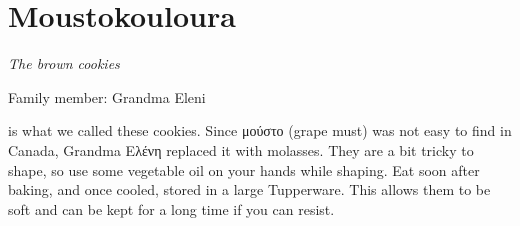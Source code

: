 \chapter{Moustokouloura}
\label{ch:moustokouloura}



\textit{The brown cookies}

Family member: Grandma Eleni

 is what we called these cookies. Since \textgreek{μούστο} (grape must) was not easy to find in Canada, Grandma \textgreek{Ελένη} replaced it with molasses. They are a bit tricky to shape, so use some vegetable oil on your hands while shaping. Eat soon after baking, and once cooled, stored in a large Tupperware. This allows them to be soft and can be kept for a long time if you can resist.

